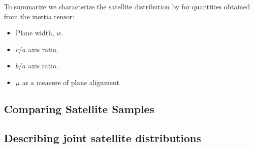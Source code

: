 \documentclass[a4paper,fleqn,usenatbib]{mnras}
\begin{document}
To summarize we characterize the satellite distribution by for
quantities obtained from the inertia tensor: 
\begin{itemize}
\item Plane width, $w$.
\item $c/a$ axis ratio.
\item $b/a$ axis ratio.
\item $\mu$ as a measure of plane alignment.
\end{itemize}


\subsection{Comparing Satellite Samples}


\subsection{Describing joint satellite distributions}


\end{document}
